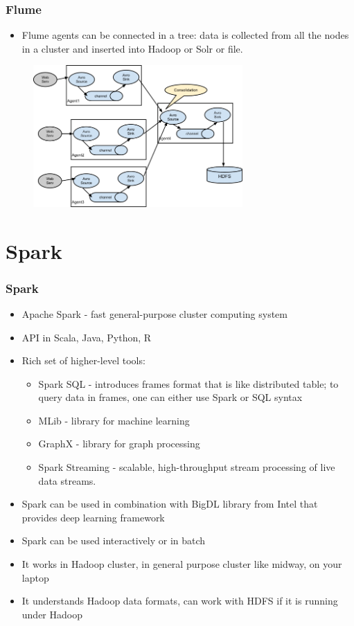 \documentclass{beamer}
\begin{document}
\begin{frame}[fragile]
 \frametitle{Flume}
 \begin{itemize}
  \item Flume agents can be connected in a tree: data is collected from all the nodes in a cluster and inserted into Hadoop or Solr or file.
 \end{itemize}

 \begin{figure}[h]
 \includegraphics[width=8cm]{graphs/UserGuide_image02.png}
 \end{figure}
\end{frame}

\section{Spark}
\begin{frame}
 \frametitle{Spark}
 \begin{itemize}
  \item Apache Spark - fast general-purpose cluster computing system
  \item API in Scala, Java, Python, R
  \item Rich set of higher-level tools:
    \begin{itemize}
      \item Spark SQL - introduces frames format that is like distributed table; to query data in frames, one can either use Spark or SQL syntax
      \item MLib - library for machine learning
      \item GraphX - library for graph processing
      \item Spark Streaming - scalable, high-throughput stream processing of live data streams.
    \end{itemize}
  \item Spark can be used in combination with BigDL library from Intel that provides deep learning framework
  \item Spark can be used interactively or in batch
  \item It works in Hadoop cluster, in general purpose cluster like midway, on your laptop
  \item It understands Hadoop data formats, can work with HDFS if it is running under Hadoop
 \end{itemize}
\end{frame}
\end{document}
